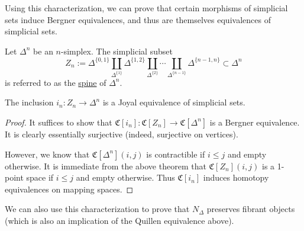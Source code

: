 Using this characterization, we can prove that certain morphisms of simplicial sets induce Bergner equivalences, and thus are themselves equivalences of simplicial sets.  

\begin{definition}
	Let $\Delta^n$ be an $n$-simplex. The simplicial subset 
	\[
	Z_n:=\Delta^{\{0,1\}}\coprod_{\Delta^{\{1\}}} \Delta^{\{1,2\}}\coprod_{\Delta^{\{2\}}} \cdots \coprod_{\Delta^{\{n-1\}}} \Delta^{\{n-1,n\}}\subset \Delta^n 
	\]
	is referred to as the \underline{spine} of $\Delta^n$.
\end{definition}

\begin{lemma}
	The inclusion $i_n:Z_n\to \Delta^n$ is a Joyal equivalence of simplicial sets.  
\end{lemma} 

\begin{proof}
	It suffices to show that $\mathfrak{C}[i_n]:\mathfrak{C}[Z_n]\to \mathfrak{C}[\Delta^n]$ is a Bergner equivalence. It is clearly essentially surjective (indeed, surjective on vertices). 
	
	However, we know that $\mathfrak{C}[\Delta^n](i,j)$ is contractible if $i\leq j$ and empty otherwise. It is immediate from the above theorem that $\mathfrak{C}[Z_n](i,j)$ is a 1-point space if $i\leq j$ and empty otherwise. Thus $\mathfrak{C}[i_n]$ induces homotopy equivalences on mapping spaces.
\end{proof}

We can also use this characterization to prove that $N_{\Delta}$ preserves fibrant objects (which is also an implication of the Quillen equivalence above).

